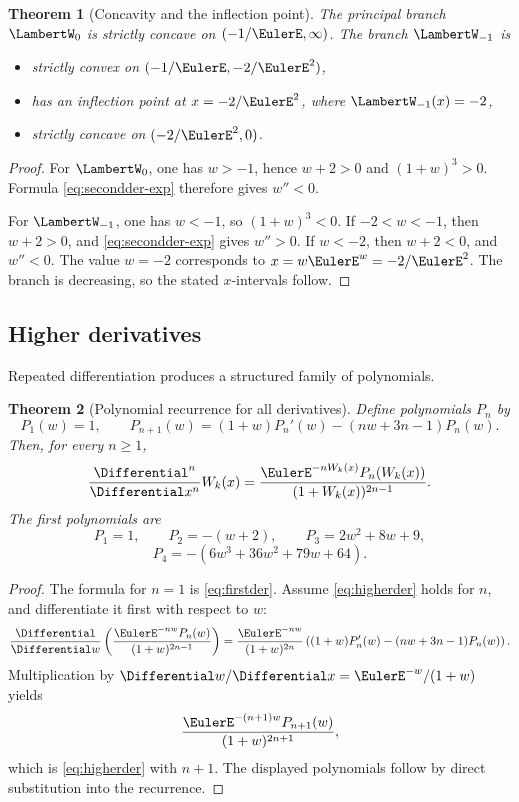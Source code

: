 \documentclass[11pt]{article}
\newtheorem{theorem}{Theorem}[section]
\theoremstyle{remark}
\newcommand{\Wz}{\LambertW_{0}}
\newcommand{\Wm}{\LambertW_{-1}}
\begin{document}
\begin{theorem}[Concavity and the inflection point]\label{thm:curvature}
The principal branch \(\Wz\) is strictly concave on
\((-1/\EulerE,\infty)\).  The branch \(\Wm\) is
\begin{itemize}
\item strictly convex on \((-1/\EulerE,-2/\EulerE^2)\),
\item has an inflection point at \(x=-2/\EulerE^2\), where \(\Wm(x)=-2\),
\item strictly concave on \((-2/\EulerE^2,0)\).
\end{itemize}
\end{theorem}

\begin{proof}
For \(\Wz\), one has \(w>-1\), hence \(w+2>0\) and
\((1+w)^3>0\).  Formula \eqref{eq:secondder-exp} therefore gives \(w''<0\).

For \(\Wm\), one has \(w<-1\), so \((1+w)^3<0\).  If \(-2<w<-1\), then
\(w+2>0\), and \eqref{eq:secondder-exp} gives \(w''>0\).  If \(w<-2\),
then \(w+2<0\), and \(w''<0\).  The value \(w=-2\) corresponds to
\(x=w\EulerE^w=-2/\EulerE^2\).  The branch is decreasing, so the stated
\(x\)-intervals follow.
\end{proof}

\subsection{Higher derivatives}

Repeated differentiation produces a structured family of polynomials.

\begin{theorem}[Polynomial recurrence for all derivatives]\label{thm:higherder}
Define polynomials \(P_n\) by
\[
 P_1(w)=1,\qquad
 P_{n+1}(w)=(1+w)P_n'(w)-(nw+3n-1)P_n(w).
\]
Then, for every \(n\geq1\),
\begin{equation}\label{eq:higherder}
 \frac{\Differential^n}{\Differential x^n}W_k(x)
 =\frac{\EulerE^{-nW_k(x)}P_n(W_k(x))}
        {(1+W_k(x))^{2n-1}}.
\end{equation}
The first polynomials are
\[
 P_1=1,\qquad P_2=-(w+2),\qquad
 P_3=2w^2+8w+9,
\]
\[
 P_4=-(6w^3+36w^2+79w+64).
\]
\end{theorem}

\begin{proof}
The formula for \(n=1\) is \eqref{eq:firstder}.  Assume
\eqref{eq:higherder} holds for \(n\), and differentiate it first with
respect to \(w\):
\[
 \frac{\Differential}{\Differential w}
 \left(\frac{\EulerE^{-nw}P_n(w)}{(1+w)^{2n-1}}\right)
 =
 \frac{\EulerE^{-nw}}{(1+w)^{2n}}
 \left((1+w)P_n'(w)-(nw+3n-1)P_n(w)\right).
\]
Multiplication by
\(\Differential w/\Differential x=\EulerE^{-w}/(1+w)\) yields
\[
 \frac{\EulerE^{-(n+1)w}P_{n+1}(w)}
 {(1+w)^{2n+1}},
\]
which is \eqref{eq:higherder} with \(n+1\).  The displayed polynomials follow
by direct substitution into the recurrence.
\end{proof}
\end{document}
